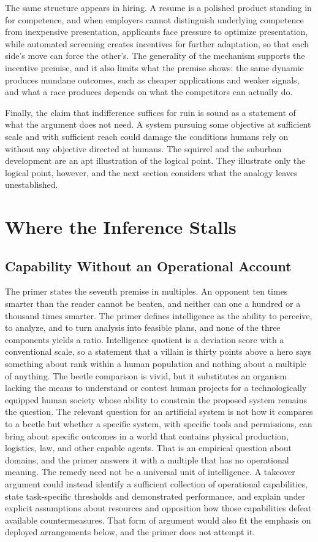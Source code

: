 \documentclass[11pt]{article}
\begin{document}
The same structure appears in hiring. A resume is a polished product standing in for competence, and when employers cannot distinguish underlying competence from inexpensive presentation, applicants face pressure to optimize presentation, while automated screening creates incentives for further adaptation, so that each side's move can force the other's. The generality of the mechanism supports the incentive premise, and it also limits what the premise shows: the same dynamic produces mundane outcomes, such as cheaper applications and weaker signals, and what a race produces depends on what the competitors can actually do.

Finally, the claim that indifference suffices for ruin is sound as a statement of what the argument does not need. A system pursuing some objective at sufficient scale and with sufficient reach could damage the conditions humans rely on without any objective directed at humans. The squirrel and the suburban development are an apt illustration of the logical point. They illustrate only the logical point, however, and the next section considers what the analogy leaves unestablished.

\section{Where the Inference Stalls}

\subsection{Capability Without an Operational Account}

The primer states the seventh premise in multiples. An opponent ten times smarter than the reader cannot be beaten, and neither can one a hundred or a thousand times smarter. The primer defines intelligence as the ability to perceive, to analyze, and to turn analysis into feasible plans, and none of the three components yields a ratio. Intelligence quotient is a deviation score with a conventional scale, so a statement that a villain is thirty points above a hero says something about rank within a human population and nothing about a multiple of anything. The beetle comparison is vivid, but it substitutes an organism lacking the means to understand or contest human projects for a technologically equipped human society whose ability to constrain the proposed system remains the question. The relevant question for an artificial system is not how it compares to a beetle but whether a specific system, with specific tools and permissions, can bring about specific outcomes in a world that contains physical production, logistics, law, and other capable agents. That is an empirical question about domains, and the primer answers it with a multiple that has no operational meaning. The remedy need not be a universal unit of intelligence. A takeover argument could instead identify a sufficient collection of operational capabilities, state task-specific thresholds and demonstrated performance, and explain under explicit assumptions about resources and opposition how those capabilities defeat available countermeasures. That form of argument would also fit the emphasis on deployed arrangements below, and the primer does not attempt it.
\end{document}

